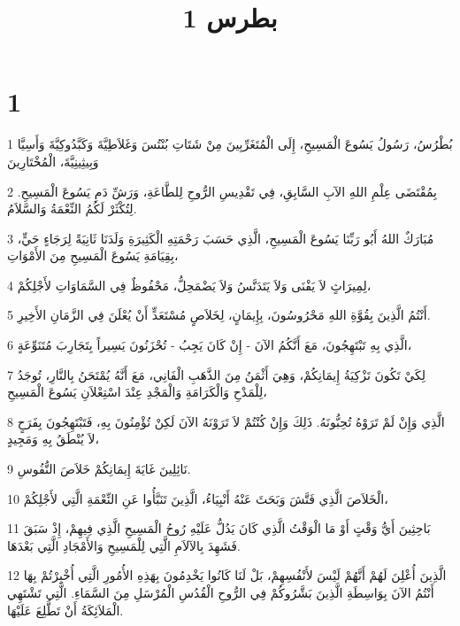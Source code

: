 

\title{1 بطرس}


\chapter{1}

\par 1 بُطْرُسُ، رَسُولُ يَسُوعَ الْمَسِيحِ، إِلَى الْمُتَغَرِّبِينَ مِنْ شَتَاتِ بُنْتُسَ وَغَلاَطِيَّةَ وَكَبَّدُوكِيَّةَ وَأَسِيَّا وَبِيثِينِيَّةَ، الْمُخْتَارِينَ
\par 2 بِمُقْتَضَى عِلْمِ اللهِ الآبِ السَّابِقِ، فِي تَقْدِيسِ الرُّوحِ لِلطَّاعَةِ، وَرَشِّ دَمِ يَسُوعَ الْمَسِيحِ. لِتُكْثَرْ لَكُمُ النِّعْمَةُ وَالسَّلاَمُ.
\par 3 مُبَارَكٌ اللهُ أَبُو رَبِّنَا يَسُوعَ الْمَسِيحِ، الَّذِي حَسَبَ رَحْمَتِهِ الْكَثِيرَةِ وَلَدَنَا ثَانِيَةً لِرَجَاءٍ حَيٍّ، بِقِيَامَةِ يَسُوعَ الْمَسِيحِ مِنَ الأَمْوَاتِ،
\par 4 لِمِيرَاثٍ لاَ يَفْنَى وَلاَ يَتَدَنَّسُ وَلاَ يَضْمَحِلُّ، مَحْفُوظٌ فِي السَّمَاوَاتِ لأَجْلِكُمْ،
\par 5 أَنْتُمُ الَّذِينَ بِقُوَّةِ اللهِ مَحْرُوسُونَ، بِإِيمَانٍ، لِخَلاَصٍ مُسْتَعَدٍّ أَنْ يُعْلَنَ فِي الزَّمَانِ الأَخِيرِ.
\par 6 الَّذِي بِهِ تَبْتَهِجُونَ، مَعَ أَنَّكُمُ الآنَ - إِنْ كَانَ يَجِبُ - تُحْزَنُونَ يَسِيراً بِتَجَارِبَ مُتَنَوِّعَةٍ،
\par 7 لِكَيْ تَكُونَ تَزْكِيَةُ إِيمَانِكُمْ، وَهِيَ أَثْمَنُ مِنَ الذَّهَبِ الْفَانِي، مَعَ أَنَّهُ يُمْتَحَنُ بِالنَّارِ، تُوجَدُ لِلْمَدْحِ وَالْكَرَامَةِ وَالْمَجْدِ عِنْدَ اسْتِعْلاَنِ يَسُوعَ الْمَسِيحِ،
\par 8 الَّذِي وَإِنْ لَمْ تَرَوْهُ تُحِبُّونَهُ. ذَلِكَ وَإِنْ كُنْتُمْ لاَ تَرَوْنَهُ الآنَ لَكِنْ تُؤْمِنُونَ بِهِ، فَتَبْتَهِجُونَ بِفَرَحٍ لاَ يُنْطَقُ بِهِ وَمَجِيدٍ،
\par 9 نَائِلِينَ غَايَةَ إِيمَانِكُمْ خَلاَصَ النُّفُوسِ.
\par 10 الْخَلاَصَ الَّذِي فَتَّشَ وَبَحَثَ عَنْهُ أَنْبِيَاءُ، الَّذِينَ تَنَبَّأُوا عَنِ النِّعْمَةِ الَّتِي لأَجْلِكُمْ،
\par 11 بَاحِثِينَ أَيُّ وَقْتٍ أَوْ مَا الْوَقْتُ الَّذِي كَانَ يَدُلُّ عَلَيْهِ رُوحُ الْمَسِيحِ الَّذِي فِيهِمْ، إِذْ سَبَقَ فَشَهِدَ بِالآلاَمِ الَّتِي لِلْمَسِيحِ وَالأَمْجَادِ الَّتِي بَعْدَهَا.
\par 12 الَّذِينَ أُعْلِنَ لَهُمْ أَنَّهُمْ لَيْسَ لأَنْفُسِهِمْ، بَلْ لَنَا كَانُوا يَخْدِمُونَ بِهَذِهِ الأُمُورِ الَّتِي أُخْبِرْتُمْ بِهَا أَنْتُمُ الآنَ بِوَاسِطَةِ الَّذِينَ بَشَّرُوكُمْ فِي الرُّوحِ الْقُدُسِ الْمُرْسَلِ مِنَ السَّمَاءِ. الَّتِي تَشْتَهِي الْمَلاَئِكَةُ أَنْ تَطَّلِعَ عَلَيْهَا.
